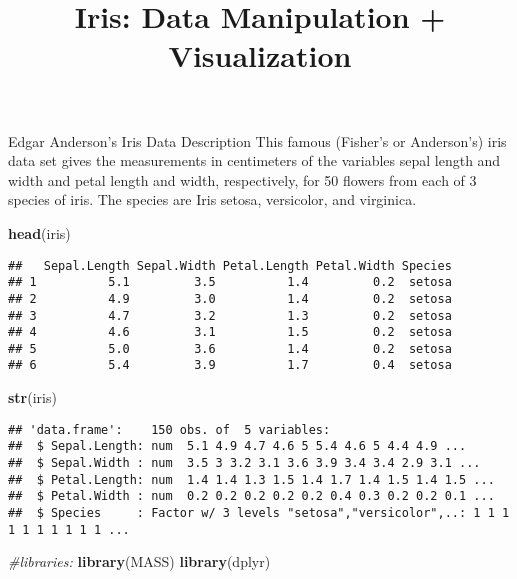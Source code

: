 \documentclass[
]{article}
\title{Iris: Data Manipulation + Visualization}
\author{}
\date{\vspace{-2.5em}}
\newenvironment{Shaded}{\begin{snugshade}}{\end{snugshade}}
\newcommand{\CommentTok}[1]{\textcolor[rgb]{0.56,0.35,0.01}{\textit{#1}}}
\newcommand{\KeywordTok}[1]{\textcolor[rgb]{0.13,0.29,0.53}{\textbf{#1}}}
\newcommand{\NormalTok}[1]{#1}
\begin{document}
\maketitle

Edgar Anderson's Iris Data Description This famous (Fisher's or
Anderson's) iris data set gives the measurements in centimeters of the
variables sepal length and width and petal length and width,
respectively, for 50 flowers from each of 3 species of iris. The species
are Iris setosa, versicolor, and virginica.

\begin{Shaded}
\begin{Highlighting}[]
\KeywordTok{head}\NormalTok{(iris)}
\end{Highlighting}
\end{Shaded}

\begin{verbatim}
##   Sepal.Length Sepal.Width Petal.Length Petal.Width Species
## 1          5.1         3.5          1.4         0.2  setosa
## 2          4.9         3.0          1.4         0.2  setosa
## 3          4.7         3.2          1.3         0.2  setosa
## 4          4.6         3.1          1.5         0.2  setosa
## 5          5.0         3.6          1.4         0.2  setosa
## 6          5.4         3.9          1.7         0.4  setosa
\end{verbatim}

\begin{Shaded}
\begin{Highlighting}[]
\KeywordTok{str}\NormalTok{(iris)}
\end{Highlighting}
\end{Shaded}

\begin{verbatim}
## 'data.frame':    150 obs. of  5 variables:
##  $ Sepal.Length: num  5.1 4.9 4.7 4.6 5 5.4 4.6 5 4.4 4.9 ...
##  $ Sepal.Width : num  3.5 3 3.2 3.1 3.6 3.9 3.4 3.4 2.9 3.1 ...
##  $ Petal.Length: num  1.4 1.4 1.3 1.5 1.4 1.7 1.4 1.5 1.4 1.5 ...
##  $ Petal.Width : num  0.2 0.2 0.2 0.2 0.2 0.4 0.3 0.2 0.2 0.1 ...
##  $ Species     : Factor w/ 3 levels "setosa","versicolor",..: 1 1 1 1 1 1 1 1 1 1 ...
\end{verbatim}

\begin{Shaded}
\begin{Highlighting}[]
\CommentTok{#libraries:}
\KeywordTok{library}\NormalTok{(MASS)}
\KeywordTok{library}\NormalTok{(dplyr)}
\end{Highlighting}
\end{Shaded}
\end{document}
